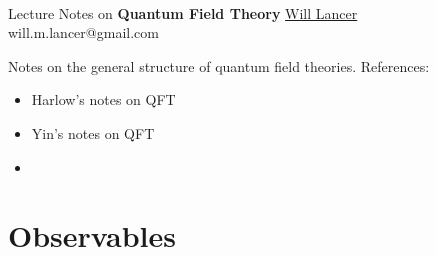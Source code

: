 \documentclass[11pt]{article}
\begin{document}
\thispagestyle{empty}
\bigskip \
\vspace{0.1cm}

\begin{center}
{\fontsize{22}{22} \selectfont Lecture Notes on}
\vskip 16pt
{\fontsize{36}{36} \selectfont \bf \sffamily Quantum Field Theory}
\vskip 24pt
{\fontsize{18}{18} \selectfont \rmfamily \href{https://will-lancer.github.io}{Will Lancer}}
\vskip 6pt
{\fontsize{14}{14} \selectfont \ttfamily will.m.lancer@gmail.com}
\vskip 24pt
\end{center}

{\parindent0pt \baselineskip=15.5pt}
\noin
Notes on the general structure of quantum field theories.
References:
\begin{itemize}
    \item Harlow's notes on QFT
    \item Yin's notes on QFT
    \item {}
\end{itemize}

\newpage
\microtoc
\newpage

\section{Observables}

\end{document}
